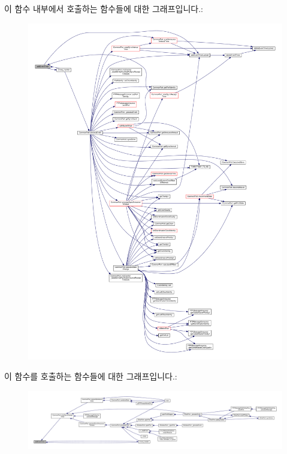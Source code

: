 이 함수 내부에서 호출하는 함수들에 대한 그래프입니다.\+:
\nopagebreak
\begin{figure}[H]
\begin{center}
\leavevmode
\includegraphics[width=350pt]{class_i_e_e_e1588_clock_a71199e4f44e22d308f9328255d80c896_cgraph}
\end{center}
\end{figure}




이 함수를 호출하는 함수들에 대한 그래프입니다.\+:
\nopagebreak
\begin{figure}[H]
\begin{center}
\leavevmode
\includegraphics[width=350pt]{class_i_e_e_e1588_clock_a71199e4f44e22d308f9328255d80c896_icgraph}
\end{center}
\end{figure}


